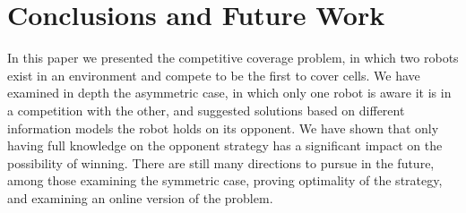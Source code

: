 \documentclass[a4paper,11pt]{article}
\theoremstyle{definition}
\newcommand{\ltr}{{{\sf{LTR}}}\xspace}
\begin{document}
\addtolength{\textheight}{-1.0cm}   %













\section{Conclusions and Future Work}
In this paper we presented the competitive coverage problem, in which two robots exist in an environment and compete to be the first to cover cells. We have examined in depth the asymmetric case, in which only one robot is aware it is in a competition with the other, and suggested solutions based on different information models the robot holds on its opponent. We have shown that only having full knowledge on the opponent strategy has a significant impact on the possibility of winning. There are still many directions to pursue in the future, among those examining the symmetric case, proving optimality of the \ltr strategy, and examining an online version of the problem.





\end{document}
